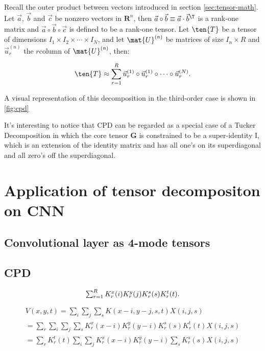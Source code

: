 Recall the outer product between vectors introduced in section \ref{sec:tensor-math}.
Let $\vec{a}$, $\vec{b}$ and $\vec{c}$ be nonzero vectors in $\mathbf{R}^{n}$, then $\vec{a} \circ \vec{b} \equiv \vec{a}\cdot \vec{b}^{\T}$ is a rank-one matrix and
$\vec{a} \circ \vec{b} \circ \vec{c}$ is defined to be a rank-one tensor. Let $\ten{T}$ be a tensor of dimensions $I_1 \times I_2 \times \cdots
\times I_N$, and let $\mat{U}^{(n)}$ be matrices of size $I_n \times R$ and $\vec{u}_r^{(n)}$ the $r$\th column of $\mat{U}^{(n)}$,
then:

\begin{equation}
    \ten{T} \approx \sum_{r=1}^{R} \vec{u}^{(1)}_r \circ \vec{u}^{(1)}_r \circ
   \cdots \circ \vec{u}^{(N)}_r.
\end{equation} 

A visual representation of this decomposition in the third-order case is shown
in \ref{fig:cpd}

It's interesting to notice that CPD can be regarded as a special case of a Tucker Decomposition in which the core tensor $\mathbf{G}$ is constrained to be a super-identity I, which is an extension of the identity matrix and has all one's on its superdiagonal and all zero's off the superdiagonal. 




\section{Application of tensor decompositon on CNN}
\label{sec:cpd-application}
\subsection{Convolutional layer as 4-mode tensors}

\subsection{CPD}

\begin{equation}
$$ \sum_{r=1}^R K^x_r(i)K^y_r(j)K^s_r(s)K^t_r(t) $$.	
\end{equation}


\begin{center}
\begin{align*}
	V(x, y, t) = \sum_i \sum_j \sum_s K(x-i, y-j, s, t)X(i, j, s) \\
		= \sum_r \sum_i \sum_j \sum_s K^x_r(x-i)K^y_r(y-i)K^s_r(s)K^t_r(t)X(i, j, s)\\
			= \sum_r K^t_r(t) \sum_i \sum_j K^x_r(x-i)K^y_r(y-i) \sum_s K^s_r(s) X(i, j, s) \tag{4}
\end{align*}
\end{center}

